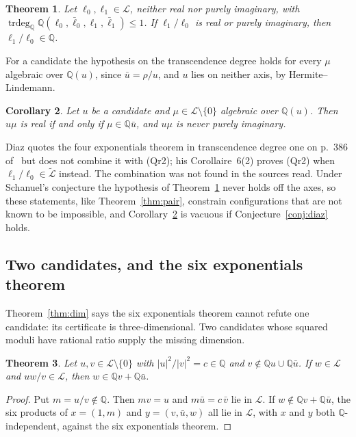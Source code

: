 \documentclass[11pt,a4paper]{article}
\theoremstyle{plain}
\newtheorem{theorem}{Theorem}[section]
\newtheorem{corollary}[theorem]{Corollary}
\theoremstyle{definition}
\newcommand{\Q}{\mathbb{Q}}
\newcommand{\Logs}{\mathcal{L}}
\newcommand{\aLogs}{\widetilde{\mathcal{L}}}
\DeclareMathOperator{\trdeg}{trdeg}
\begin{document}
\begin{theorem}\label{thm:qr2}
Let $\ell_{0},\ell_{1}\in\Logs$, neither real nor purely imaginary, with
$\trdeg_{\Q}\Q(\ell_{0},\bar\ell_{0},\ell_{1},\bar\ell_{1})\le1$. If $\ell_{1}/\ell_{0}$ is real or
purely imaginary, then $\ell_{1}/\ell_{0}\in\Q$.
\end{theorem}

For a candidate the hypothesis on the transcendence degree holds for every $\mu$ algebraic over
$\Q(u)$, since $\bar u=\rho/u$, and $u$ lies on neither axis, by Hermite--Lindemann.

\begin{corollary}\label{cor:axis-partner}
Let $u$ be a candidate and $\mu\in\Logs\setminus\{0\}$ algebraic over $\Q(u)$. Then $u\mu$ is real if
and only if $\mu\in\Q\bar u$, and $u\mu$ is never purely imaginary.
\end{corollary}

Diaz quotes the four exponentials theorem in transcendence degree one on p.~386 of~\cite{diaz-2007}
but does not combine it with (Qr2); his Corollaire~6(2) proves (Qr2) when $\ell_{1}/\ell_{0}\in\aLogs$
instead. The combination was not found in the sources read. Under Schanuel's conjecture the
hypothesis of Theorem~\ref{thm:qr2} never holds off the axes, so these statements, like
Theorem~\ref{thm:pair}, constrain configurations that are not known to be impossible, and
Corollary~\ref{cor:axis-partner} is vacuous if Conjecture~\ref{conj:diaz} holds.

\subsection*{Two candidates, and the six exponentials theorem}

Theorem~\ref{thm:dim} says the six exponentials theorem cannot refute one candidate: its
certificate is three-dimensional. Two candidates whose squared moduli have rational ratio supply
the missing dimension.

\begin{theorem}\label{thm:multipliers}
Let $u,v\in\Logs\setminus\{0\}$ with $|u|^{2}/|v|^{2}=c\in\Q$ and $v\notin\Q u\cup\Q\bar u$. If
$w\in\Logs$ and $uw/v\in\Logs$, then $w\in\Q v+\Q\bar u$.
\end{theorem}

\begin{proof}
Put $m=u/v\notin\Q$. Then $mv=u$ and $m\bar u=c\,\bar v$ lie in $\Logs$. If
$w\notin\Q v+\Q\bar u$, the six products of $x=(1,m)$ and $y=(v,\bar u,w)$ all lie in $\Logs$, with
$x$ and $y$ both $\Q$-independent, against the six exponentials theorem.
\end{proof}
\end{document}

